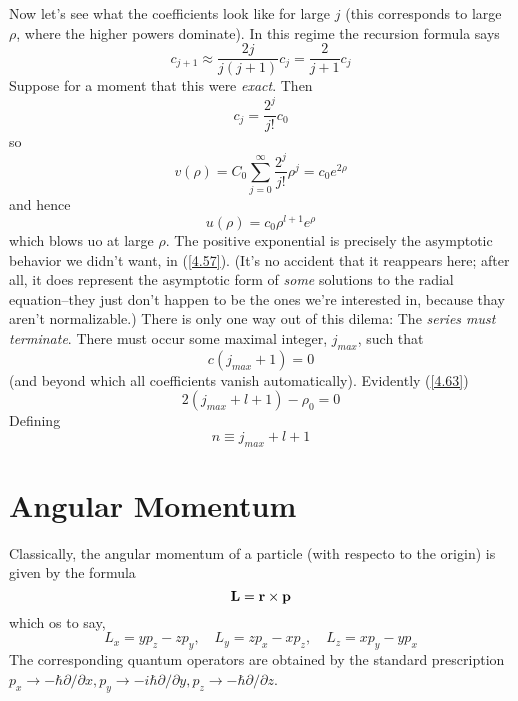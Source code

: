 Now let's see what the coefficients look like for large $j$ (this corresponds to large $\rho$, where the higher powers dominate). In this regime the recursion formula says $$c_{j+1}\approx \frac{2j}{j(j+1)}c_j=\frac{2}{j+1}c_j$$ Suppose for a moment that this were \textit{exact}. Then 
\begin{equation}\label{4.64}
	c_j=\frac{2^j}{j!}c_0
\end{equation}
so $$ v(\rho)=C_0\sum_{j=0}^\infty \frac{2^j}{j!}\rho^j=c_0e^{2\rho}$$ and hence 
\begin{equation}\label{4.65}
	u(\rho)=c_0\rho^{l+1}e^\rho
\end{equation}
which blows uo at large $\rho$. The positive exponential is precisely the asymptotic behavior we didn't want, in (\ref{4.57}). (It's no accident that it reappears here; after all, it does represent the asymptotic form of \textit{some} solutions to the radial equation--they just don't happen to be the ones we're interested in, because thay aren't normalizable.) There is only one way out of this dilema: The \textit{series must terminate}. There must occur some maximal integer, $j_{max}$, such that
\begin{equation}\label{4.66}
	c(j_{max}+1)=0
\end{equation}
(and beyond which all coefficients vanish automatically). Evidently (\ref{4.63}) $$2(j_{max}+l+1)-\rho_0=0$$ Defining
\begin{equation}\label{4.67}
	n\equiv j_{max} +l+1
\end{equation}





























\section{Angular Momentum}

Classically, the angular momentum of a particle (with respecto to the origin) is given by the formula
\begin{equation}\label{4.95}
	\vb{L}=\vb{r}\times\vb{p}
\end{equation}
which os to say,
\begin{equation}\label{4.96}
	L_x=yp_z-zp_y,\quad L_y=zp_x-xp_z,\quad L_z=xp_y-yp_x
\end{equation}
The corresponding quantum operators are obtained by the standard prescription $p_x\to -\hbar\partial/\partial x, p_y\to -i\hbar\partial/\partial y, p_z\to -\hbar\partial/\partial z$.

